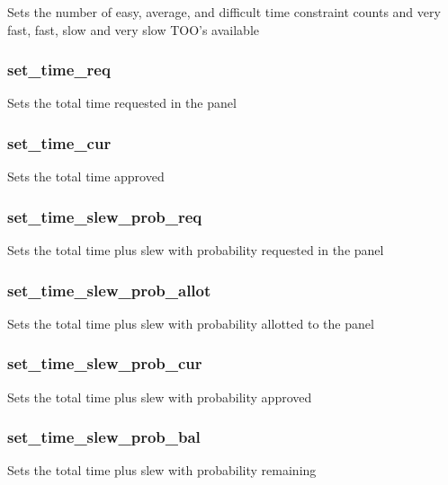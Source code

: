 \documentclass{article}
\begin{document}
Sets the number of easy, average, and difficult time constraint counts and 
very fast, fast, slow and very slow TOO's available

\subsubsection*{set\_time\_req\label{Panel_set_time_req}}


Sets the total time requested in the panel

\subsubsection*{set\_time\_cur\label{Panel_set_time_cur}}


Sets the total time approved

\subsubsection*{set\_time\_slew\_prob\_req\label{Panel_set_time_slew_prob_req}}


Sets the total time plus slew with probability requested in the panel

\subsubsection*{set\_time\_slew\_prob\_allot\label{Panel_set_time_slew_prob_allot}}


Sets the total time plus slew with probability allotted to the panel

\subsubsection*{set\_time\_slew\_prob\_cur\label{Panel_set_time_slew_prob_cur}}


Sets the total time plus slew with probability approved

\subsubsection*{set\_time\_slew\_prob\_bal\label{Panel_set_time_slew_prob_bal}}


Sets the total time plus slew with probability remaining
\end{document}

